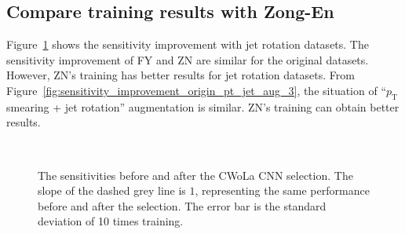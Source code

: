 \documentclass[12pt]{article}
\begin{document}
    \subsection{Compare training results with Zong-En}%
    \label{sub:compare_training_results_with_zong_en}
        Figure~\ref{fig:sensitivity_improvement_origin_jet_aug_3_ZN} shows the sensitivity improvement with jet rotation datasets. The sensitivity improvement of FY and ZN are similar for the original datasets. However, ZN's training has better results for jet rotation datasets. From Figure~\ref{fig:sensitivity_improvement_origin_pt_jet_aug_3}, the situation of ``$p_{\text{T}}$ smearing + jet rotation'' augmentation is similar. ZN's training can obtain better results.
        \begin{figure}[htpb]
            \centering
             \\
            \caption{The sensitivities before and after the CWoLa CNN selection. The slope of the dashed grey line is $1$, representing the same performance before and after the selection. The error bar is the standard deviation of 10 times training.}
            \label{fig:sensitivity_improvement_origin_jet_aug_3_ZN}
        \end{figure}
\end{document}
